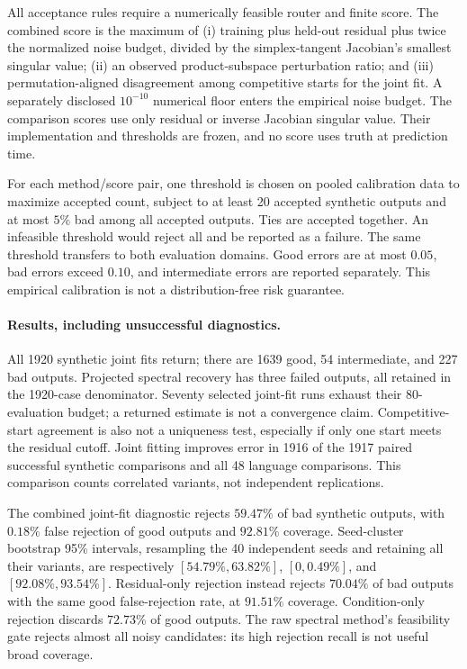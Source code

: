 All acceptance rules require a numerically feasible router and finite score.
The combined score is the maximum of (i) training plus held-out residual
plus twice the normalized noise budget, divided by the simplex-tangent
Jacobian's smallest singular value; (ii) an observed product-subspace
perturbation ratio; and (iii) permutation-aligned disagreement among
competitive starts for the joint fit. A separately disclosed $10^{-10}$
numerical floor enters the empirical noise budget.
The comparison scores use only residual or inverse Jacobian singular value.
Their implementation and thresholds are frozen, and no score uses truth
at prediction time.

For each method/score pair, one threshold is chosen on pooled calibration
data to maximize accepted count, subject to at least 20 accepted synthetic
outputs and at most $5\%$ bad among all accepted outputs. Ties are accepted
together. An infeasible threshold would reject all and be reported as a
failure. The same threshold transfers to both evaluation domains.
Good errors are at most $0.05$, bad errors exceed $0.10$, and intermediate
errors are reported separately. This empirical calibration is not a
distribution-free risk guarantee.



\paragraph{Results, including unsuccessful diagnostics.}
All 1920 synthetic joint fits return; there are 1639 good, 54 intermediate,
and 227 bad outputs. Projected spectral recovery has three failed outputs,
all retained in the 1920-case denominator.
Seventy selected joint-fit runs exhaust their 80-evaluation budget; a returned
estimate is not a convergence claim. Competitive-start agreement is also
not a uniqueness test, especially if only one start meets the residual cutoff.
Joint fitting improves error in 1916 of the 1917 paired successful
synthetic comparisons and all 48 language comparisons.
This comparison counts correlated variants, not independent replications.

The combined joint-fit diagnostic rejects $59.47\%$ of bad synthetic
outputs, with $0.18\%$ false rejection of good outputs and $92.81\%$
coverage. Seed-cluster bootstrap 95\% intervals, resampling the 40 independent
seeds and retaining all their variants, are respectively
$[54.79\%,63.82\%]$, $[0,0.49\%]$, and $[92.08\%,93.54\%]$.
Residual-only rejection instead rejects $70.04\%$ of bad outputs with
the same good false-rejection rate, at $91.51\%$ coverage.
Condition-only rejection discards $72.73\%$ of good outputs.
The raw spectral method's feasibility gate rejects almost all noisy
candidates: its high rejection recall is not useful broad coverage.

